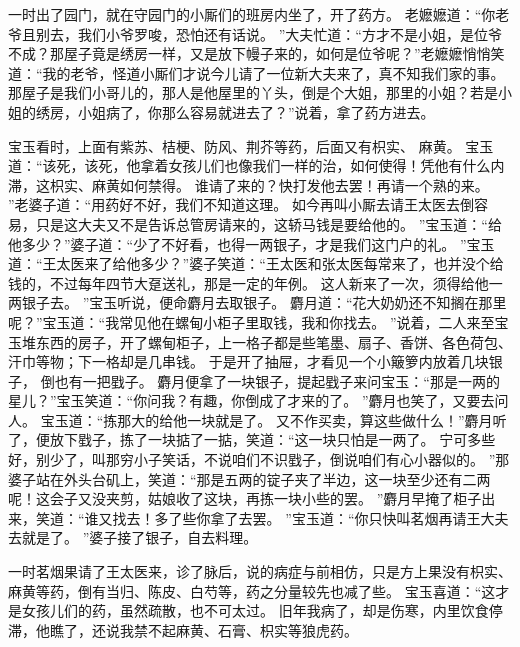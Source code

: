 一时出了园门，就在守园门的小厮们的班房内坐了，开了药方。
老嬷嬷道：“你老爷且别去，我们小爷罗唆，恐怕还有话说。
”大夫忙道：“方才不是小姐，是位爷不成？那屋子竟是绣房一样，又是放下幔子来的，如何是位爷呢？”老嬷嬷悄悄笑道：“我的老爷，怪道小厮们才说今儿请了一位新大夫来了，真不知我们家的事。
那屋子是我们小哥儿的，那人是他屋里的丫头，倒是个大姐，那里的小姐？若是小姐的绣房，小姐病了，你那么容易就进去了？”说着，拿了药方进去。
\par
宝玉看时，上面有紫苏、桔梗、防风、荆芥等药，后面又有枳实、
麻黄。
宝玉道：“该死，该死，他拿着女孩儿们也像我们一样的治，如何使得！凭他有什么内滞，这枳实、麻黄如何禁得。
谁请了来的？快打发他去罢！再请一个熟的来。
”老婆子道：“用药好不好，我们不知道这理。
如今再叫小厮去请王太医去倒容易，只是这大夫又不是告诉总管房请来的，这轿马钱是要给他的。
”宝玉道：“给他多少？”婆子道：“少了不好看，也得一两银子，才是我们这门户的礼。
”宝玉道：“王太医来了给他多少？”婆子笑道：“王太医和张太医每常来了，也并没个给钱的，不过每年四节大趸送礼，那是一定的年例。
这人新来了一次，须得给他一两银子去。
”宝玉听说，便命麝月去取银子。
麝月道：“花大奶奶还不知搁在那里呢？”宝玉道：“我常见他在螺甸小柜子里取钱，我和你找去。
”说着，二人来至宝玉堆东西的房子，开了螺甸柜子，上一格子都是些笔墨、扇子、香饼、各色荷包、汗巾等物；下一格却是几串钱。
于是开了抽屉，才看见一个小簸箩内放着几块银子，
倒也有一把戥子。
麝月便拿了一块银子，提起戥子来问宝玉：“那是一两的星儿？”宝玉笑道：“你问我？有趣，你倒成了才来的了。
”麝月也笑了，又要去问人。
宝玉道：“拣那大的给他一块就是了。
又不作买卖，算这些做什么！”麝月听了，便放下戥子，拣了一块掂了一掂，笑道：“这一块只怕是一两了。
宁可多些好，别少了，叫那穷小子笑话，不说咱们不识戥子，倒说咱们有心小器似的。
”那婆子站在外头台矶上，笑道：“那是五两的锭子夹了半边，这一块至少还有二两呢！这会子又没夹剪，姑娘收了这块，再拣一块小些的罢。
”麝月早掩了柜子出来，笑道：“谁又找去！多了些你拿了去罢。
”宝玉道：“你只快叫茗烟再请王大夫去就是了。
”婆子接了银子，自去料理。
\par
一时茗烟果请了王太医来，诊了脉后，说的病症与前相仿，只是方上果没有枳实、麻黄等药，倒有当归、陈皮、白芍等，药之分量较先也减了些。
宝玉喜道：“这才是女孩儿们的药，虽然疏散，也不可太过。
旧年我病了，却是伤寒，内里饮食停滞，他瞧了，还说我禁不起麻黄、石膏、枳实等狼虎药。
